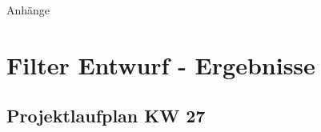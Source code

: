 %
%
%
\begin{appendix}

\newpage

\begin{center}
	\huge{Anhänge}
\end{center}

\normalsize

\section{Filter Entwurf - Ergebnisse}
\label{FirFilterResult}


\newpage
\begin{landscape}
	\section{Projektlaufplan KW 27}
	\label{sec:projectplan}
	\scalebox{.75}{
		
		}
\end{landscape}


\end{appendix}
